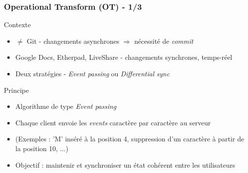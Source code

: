 \documentclass{beamer}
\begin{document}
\begin{frame}
    \frametitle{Operational Transform (OT) - 1/3}
    \begin{block}{Contexte}
        \begin{itemize}
            \item $\neq$ Git - changements asynchrones $\Rightarrow$ nécessité de \textit{commit}
            \item Google Docs, Etherpad, LiveShare - changements synchrones, temps-réel
            \item Deux stratégies - \textit{Event passing} ou \textit{Differential sync}
        \end{itemize}
    \end{block}

    \begin{block}{Principe}
        \begin{itemize}
            \item Algorithme de type \textit{Event passing}
            \item Chaque client envoie les \textit{events} caractère par caractère au serveur
            \item (Exemples : 'M' inséré à la position 4, suppression d'un caractère à partir de la position 10, ...)
            \item Objectif : maintenir et synchroniser un état cohérent entre les utilisateurs
        \end{itemize}
    \end{block}
\end{frame}
\end{document}
